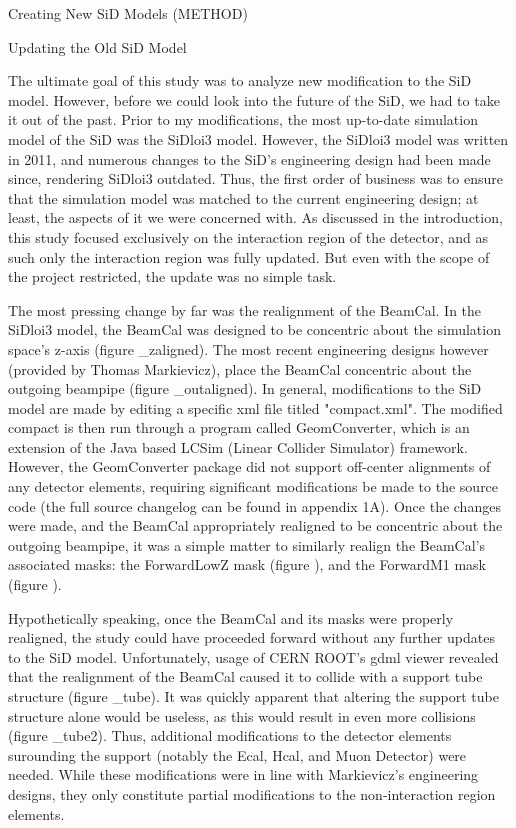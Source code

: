 Creating New SiD Models (METHOD)
    
    Updating the Old SiD Model
        
        The ultimate goal of this study was to analyze new modification to the SiD model. However, before we could look into the future of the SiD, we had to take it out of the past. Prior to my modifications, the most up-to-date simulation model of the SiD was the SiDloi3 model. However, the SiDloi3 model was written in 2011, and numerous changes to the SiD's engineering design had been made since, rendering SiDloi3 outdated. Thus, the first order of business was to ensure that the simulation model was matched to the current engineering design; at least, the aspects of it we were concerned with. As discussed in the introduction, this study focused exclusively on the interaction region of the detector, and as such only the interaction region was fully updated. But even with the scope of the project restricted, the update was no simple task.

        The most pressing change by far was the realignment of the BeamCal. In the SiDloi3 model, the BeamCal was designed to be concentric about the simulation space's z-axis (figure \beamcal_zaligned). The most recent engineering designs however (provided by Thomas Markievicz), place the BeamCal concentric about the outgoing beampipe (figure \beamcal_outaligned). In general, modifications to the SiD model are made by editing a specific xml file titled "compact.xml". The modified compact is then run through a program called GeomConverter, which is an extension of the Java based LCSim (Linear Collider Simulator) framework. However, the GeomConverter package did not support off-center alignments of any detector elements, requiring significant modifications be made to the source code (the full source changelog can be found in appendix 1A). Once the changes were made, and the BeamCal appropriately realigned to be concentric about the outgoing beampipe, it was a simple matter to similarly realign the BeamCal's associated masks: the ForwardLowZ mask (figure \forwardlowz), and the ForwardM1 mask (figure ). 

        Hypothetically speaking, once the BeamCal and its masks were properly realigned, the study could have proceeded forward without any further updates to the SiD model. Unfortunately, usage of CERN ROOT's gdml viewer revealed that the realignment of the BeamCal caused it to collide with a support tube structure (figure \support_tube). It was quickly apparent that altering the support tube structure alone would be useless, as this would result in even more collisions (figure \support_tube2). Thus, additional modifications to the detector elements surounding the support (notably the Ecal, Hcal, and Muon Detector) were needed. While these modifications were in line with Markievicz's engineering designs, they only constitute partial modifications to the non-interaction region elements.

